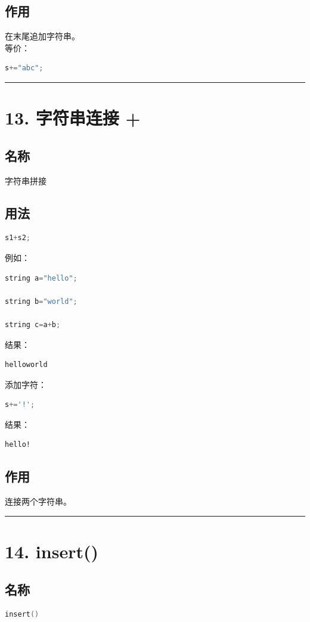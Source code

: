 \documentclass[9pt,twocolumn]{extarticle}
\begin{document}
\subsection{作用}
在末尾追加字符串。\\
等价：
\begin{lstlisting}[language=C++]
s+="abc";
\end{lstlisting}

\noindent\rule{\linewidth}{0.4pt}

\section{13. 字符串连接 +}

\subsection{名称}
字符串拼接

\subsection{用法}
\begin{lstlisting}[language=C++]
s1+s2;
\end{lstlisting}
例如：
\begin{lstlisting}[language=C++]
string a="hello";

string b="world";

string c=a+b;
\end{lstlisting}
结果：
\begin{lstlisting}
helloworld
\end{lstlisting}
添加字符：
\begin{lstlisting}[language=C++]
s+='!';
\end{lstlisting}
结果：
\begin{lstlisting}
hello!
\end{lstlisting}

\subsection{作用}
连接两个字符串。

\noindent\rule{\linewidth}{0.4pt}

\section{14. insert()}

\subsection{名称}
\begin{lstlisting}[language=C++]
insert()
\end{lstlisting}
\end{document}
